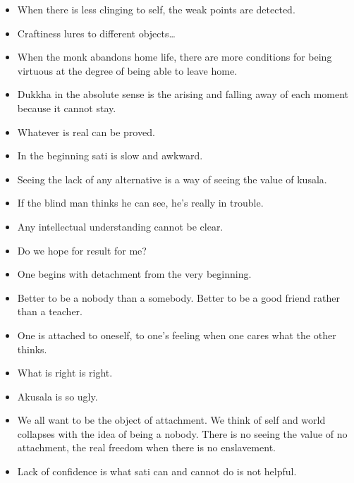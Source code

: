 \documentclass{article}
\begin{document}
\begin{itemize}
\item 
  When there is less clinging to self, the weak points are detected.

\item 
  Craftiness lures to different objects\ldots{}

\item 
  When the monk abandons home life, there are more conditions for
  being virtuous at the degree of being able to leave home.

\item 
  Dukkha in the absolute sense is the arising and falling away of
  each moment because it cannot stay.

\item 
  Whatever is real can be proved.

\item 
  In the beginning sati is slow and awkward.

\item 
  Seeing the lack of any alternative is a way of seeing the value of
  kusala.

\item 
  If the blind man thinks he can see, he's really in trouble.

\item 
  Any intellectual understanding cannot be clear.

\item 
  Do we hope for result for me?

\item 
  One begins with detachment from the very beginning.

\item 
  Better to be a nobody than a somebody. Better to be a good friend
  rather than a teacher.

\item 
  One is attached to oneself, to one's feeling when one cares what
  the other thinks.

\item 
  What is right is right.

\item 
  Akusala is so ugly.

\item 
  We all want to be the object of attachment. We think of self and
  world collapses with the idea of being a nobody. There is no seeing
  the value of no attachment, the real freedom when there is no
  enslavement.

\item 
  Lack of confidence is what sati can and cannot do is not helpful.


\end{itemize}
\end{document}
